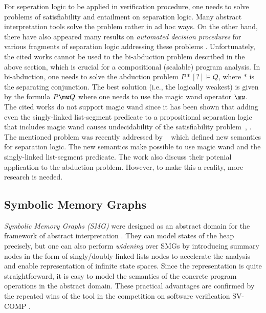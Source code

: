           For seperation logic to be applied in verification procedure, one needs to solve problems
          of satisfiability and entailment on separation logic.
          Many abstract interpretation tools solve the problem rather in ad hoc ways.
          On the other hand, there have also appeared many results on \emph{automated decision
          procedures} for various fragments of separation logic addressing these problems
          \cite{enea_compositional_2014, iosif_deciding_2014,
          soa-JensFlorian:BeyondSymHeap:20, soa-LocLe:VMCAI21, soa-Radu:CADE21}.
          Unfortunately, the cited works cannot be used to the bi-abduction problem described in
          the above section, which is crucial for a compositional (scalable) program analysis.
          In bi-abduction, one needs to solve the abduction problem $P * [?] \models Q$,
          where $*$ is the separating conjunction.
          The best solution (i.e., the logically weakest) is given by the formula $P \mw Q$
          where one needs to use the magic wand operator $\mw$.
          The cited works do not support magic wand since it has been shown
          that adding even the singly-linked list-segment predicate to a propositional separation
          logic that includes magic wand causes undecidability of the satisfiability
          problem~\cite{soa-conf/fossacs/DemriLM18}, \cite{soa-books/daglib/0034962}.
          The mentioned problem was recently addressed by ~\cite{soa-conf/esop/PagelZ21}
          which defined new semantics for separation logic.
          The new semantics make possible to use magic wand and the singly-linked list-segment
          predicate.
          The work also discuss their potenial application to the abduction problem.
          However, to make this a reality, more research is needed.

	  \subsection{Symbolic Memory Graphs}

	  \emph{Symbolic Memory Graphs (SMG)} \cite{dudka13sas} were designed as
	  an abstract domain for the framework of abstract interpretation \cite{cousot:popl77}.
	  They can model states of the heap precisely, but one can also perform \emph{widening} over SMGs by introducing
	  summary nodes in the form of singly/doubly-linked lists nodes to
	  accelerate the analysis and enable representation of infinite state spaces.
	  Since the representation is quite straightforward, it is easy to model
	  the semantics of the concrete program operations in the abstract domain.
	  These practical advantages are confirmed by the repeated wins of the tool in the competition on software verification SV-COMP \cite{svcompweb}.

